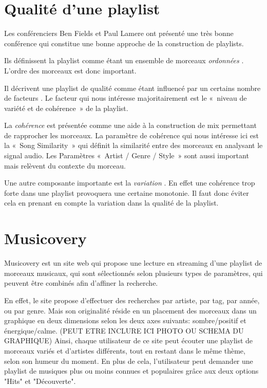 
\section{Qualité d'une playlist}
\label{existant:qualite}

Les conférenciers Ben Fields et Paul Lamere ont présenté une très bonne
conférence \cite{ismir2010:playlist-tutorial} qui constitue une bonne approche
de la construction de playlists.

Ils définissent la playlist comme étant un ensemble de morceaux \emph{ordonnées}
\cite[p.~7]{ismir2010:playlist-tutorial}. L'ordre des morceaux est donc
important.

Il décrivent une playlist de qualité comme étant influencé par un certains
nombre de facteurs \cite[p.~17--18]{ismir2010:playlist-tutorial}. Le facteur qui
nous intéresse majoritairement est le «~niveau de variété et de cohérence~» de
la playlist.

La \emph{cohérence} est présentée \cite[p.~21 -- 23]{ismir2010:playlist-tutorial}
comme une aide à la construction de mix permettant de rapprocher les morceaux.
La paramètre de cohérence qui nous intéresse ici est la «~Song Similarity~» qui
définit la similarité entre des morceaux en analysant le signal audio.
Les Paramètres «~Artist / Genre / Style~» sont aussi important mais relèvent du
contexte du morceau.

Une autre composante importante est la \emph{variation} 
\cite[p.~32]{ismir2010:playlist-tutorial}. En effet une cohérence trop forte
dans une playlist provoquera une certaine monotonie. Il faut donc éviter cela
en prenant en compte la variation dans la qualité de la playlist.

\section{Musicovery} \label{existant:musicovery}

Musicovery est un site web qui propose une lecture en streaming d'une 
playlist de morceaux musicaux, qui sont sélectionnés selon plusieurs types 
de paramètres, qui peuvent être combinés afin d'affiner la recherche.

En effet, le site propose d'effectuer des recherches par artiste, par tag, 
par année, ou par genre. Mais son originalité réside en un placement des 
morceaux dans un graphique en deux dimensions selon les deux axes suivants:
sombre/positif et énergique/calme. (PEUT ETRE INCLURE ICI PHOTO OU SCHEMA DU GRAPHIQUE)
Ainsi, chaque utilisateur de ce site peut écouter une playlist de morceaux 
variés et d'artistes différents, tout en restant dans le même thème, selon 
son humeur du moment.
En plus de cela, l'utilisateur peut demander une playlist de musiques plus 
ou moins connues et populaires grâce aux deux options "Hits" et "Découverte".

